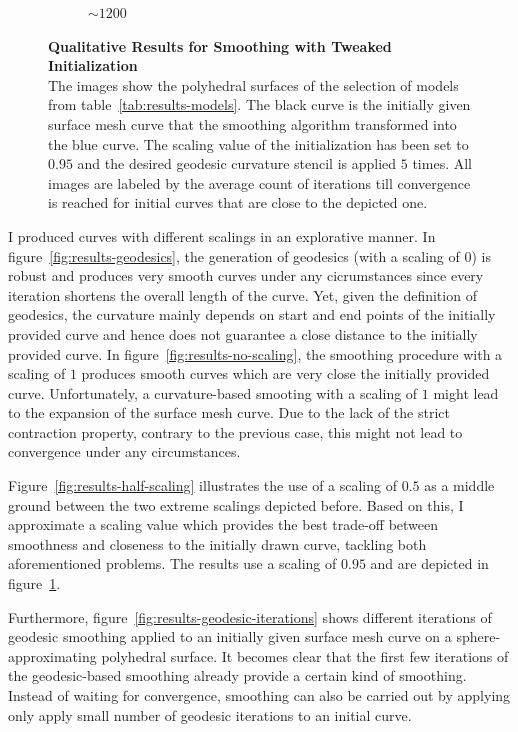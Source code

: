\documentclass{stdlocal}
\begin{document}
\begin{figure}
\begin{subfigure}[b]{0.24\linewidth}
    \caption{$\sim 1200$}
  \end{subfigure}
  \caption[Qualitative Results for Smoothing with Tweaked Initialization]{%
    \textbf{Qualitative Results for Smoothing with Tweaked Initialization}\\
    The images show the polyhedral surfaces of the selection of models from table~\ref{tab:results-models}.
    The black curve is the initially given surface mesh curve that the smoothing algorithm transformed into the blue curve.
    The scaling value of the initialization has been set to $0.95$ and the desired geodesic curvature stencil is applied $5$ times.
    All images are labeled by the average count of iterations till convergence is reached for initial curves that are close to the depicted one.
  }
  \label{fig:results-tweaked}
\end{figure}

I produced curves with different scalings in an explorative manner.
In figure~\ref{fig:results-geodesics}, the generation of geodesics (with a scaling of $0$) is robust and produces very smooth curves under any cicrumstances since every iteration shortens the overall length of the curve.
Yet, given the definition of geodesics, the curvature mainly depends on start and end points of the initially provided curve and hence does not guarantee a close distance to the initially provided curve.
In figure~\ref{fig:results-no-scaling}, the smoothing procedure with a scaling of $1$ produces smooth curves which are very close the initially provided curve.
Unfortunately, a curvature-based smooting with a scaling of $1$ might lead to the expansion of the surface mesh curve.
Due to the lack of the strict contraction property, contrary to the previous case, this might not lead to convergence under any circumstances.

Figure~\ref{fig:results-half-scaling} illustrates the use of a scaling of $0.5$ as a middle ground between the two extreme scalings depicted before.
Based on this, I approximate a scaling value which provides the best trade-off between smoothness and closeness to the initially drawn curve, tackling both aforementioned problems.
The results use a scaling of $0.95$ and are depicted in figure~\ref{fig:results-tweaked}.

Furthermore, figure~\ref{fig:results-geodesic-iterations} shows different iterations of geodesic smoothing applied to an initially given surface mesh curve on a sphere-approximating polyhedral surface.
It becomes clear that the first few iterations of the geodesic-based smoothing already provide a certain kind of smoothing.
Instead of waiting for convergence, smoothing can also be carried out by applying only apply small number of geodesic iterations to an initial curve.
\end{document}
